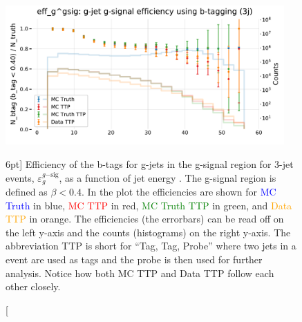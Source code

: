 \documentclass[a4paper, twoside, nobib]{tufte-book}
\newcommand{\code}[1]{\colorbox{light-gray}{\texttt{\detokenize{#1}}}}
\newcommand{\q}[1]{``#1''}
\begin{document}
\begin{figure}
  \includegraphics[width=0.95\textwidth, trim=0 0 0 40, clip]{figures/quarks/eff_g_gsig-down_sample=1.00-ML_vars=vertex-selection=b-ejet_min=4-n_iter_RS_lgb=99-n_iter_RS_xgb=9-cdot_cut=0.90-version=19.pdf}
  \caption[b-Tagging Efficiency $\varepsilon_g^{g\mathrm{-sig}}$ as a function of jet energy][6pt]
          {Efficiency of the b-tags for g-jets in the g-signal region for 3-jet events, $\varepsilon_g^{g\mathrm{-sig}}$, as a function of jet energy \code{Ejet}. The g-signal region is defined as $\beta < 0.4$. In the plot the efficiencies are shown for \textcolor{blue}{MC Truth} in blue, \textcolor{red}{MC TTP} in red, \textcolor{green}{MC Truth TTP} in green, and \textcolor{orange}{Data TTP} in orange. The efficiencies (the errorbars) can be read off on the left y-axis and the counts (histograms) on the right y-axis. The abbreviation TTP is short for \q{Tag, Tag, Probe} where two jets in a event are used as tags and the probe is then used for further analysis. Notice how both MC TTP and Data TTP follow each other closely.  
          } 
  \label{fig:q:effiency_btag_gjet_gsig}
\end{figure}
\end{document}
